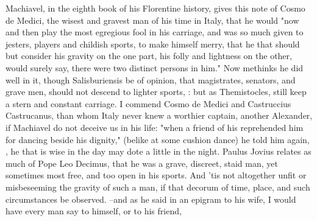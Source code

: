 {Machiavel, in the eighth book of his Florentine history, gives this note of Cosmo de Medici, the wisest and gravest man of his time in Italy, that he would "now and then play the most egregious fool in his carriage, and was so much given to jesters, players and childish sports, to make himself merry, that he that should but consider his gravity on the one part, his folly and lightness on the other, would surely say, there were two distinct persons in him." Now methinks he did well in it, though Salisburiensis be of opinion, that magistrates, senators, and grave men, should not descend to lighter sports, : but as Themistocles, still keep a stern and constant carriage. I commend Cosmo de Medici and Castruccius Castrucanus, than whom Italy never knew a worthier captain, another Alexander, if Machiavel do not deceive us in his life: "when a friend of his reprehended him for dancing beside his dignity," (belike at some cushion dance) he told him again, , he that is wise in the day may dote a little in the night. Paulus Jovius relates as much of Pope Leo Decimus, that he was a grave, discreet, staid man, yet sometimes most free, and too open in his sports. And 'tis not altogether unfit or misbeseeming the gravity of such a man, if that decorum of time, place, and such circumstances be observed.  --and as he said in an epigram to his wife, I would have every man say to himself, or to his friend,

}
